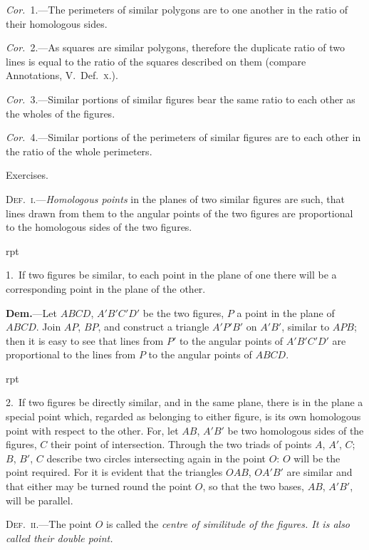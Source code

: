 \documentclass[oneside]{book}
\newcommand\exhead[1]{
\Needspace*{5\baselineskip}\begin{center}
\textsf{#1}
\end{center}
}
\newcommand\imgflow[3]{
\setcounter{wrapwidth}{#1}
\begin{wrapfigure}[#2]{r}{\value{wrapwidth}pt}
\begin{center}
\vspace{-0.3in}
\end{center}
\end{wrapfigure}
}
\begin{document}
\emph{Cor.}~1.---The perimeters of similar polygons are to
one another in the ratio of their homologous sides.

\emph{Cor.}~2.---As squares are similar polygons, therefore
the duplicate ratio of two lines is equal to the ratio of
the squares described on them (compare Annotations,
V.~Def.~\textsc{x.}).

\emph{Cor.}~3.---Similar portions of similar figures bear the
same ratio to each other as the wholes of the figures.

\emph{Cor.}~4.---Similar portions of the perimeters of similar
figures are to each other in the ratio of the whole perimeters.


\exhead{Exercises.}

\textsc{Def.~i.}---\emph{Homologous points} in the planes of two
similar figures are such, that lines drawn from them
to the angular points of the two figures are proportional
to the homologous sides of the two figures.

\smallskip
\imgflow{190}{11}{f199}

\begin{footnotesize}
1.~If two figures be similar, to each point in the plane of one
there will be a corresponding
point in the
plane of the other.

\textbf{Dem.}---Let $ABCD$,
$A'B'C'D'$ be the two
figures, $P$ a point in
the plane of $ABCD$.
Join $AP$, $BP$, and construct
a triangle $A'P'B'$
on $A'B'$, similar to
$APB$; then it is easy to see that lines from $P'$ to the angular
points of $A'B'C'D'$ are proportional to the lines from $P$ to the
angular points of $ABCD$.

\imgflow{170}{12}{f200}

2.~If two figures be directly similar, and in the same plane,
there is in the plane a special point which, regarded as belonging
to either figure, is its own
homologous point with respect
to the other. For,
let $AB$, $A'B'$ be two homologous
sides of the figures,
$C$ their point of intersection.
Through the two triads of
points $A$, $A'$, $C$; $B$, $B'$, $C$
describe two circles intersecting
again in the point
$O$: $O$ will be the point required.
For it is evident
that the triangles $OAB$, $OA'B'$ are similar and that either may
be turned round the point $O$, so that the two bases, $AB$, $A'B'$,
will be parallel.
\par\end{footnotesize}

\textsc{Def.~ii.}---The point $O$ is called the \emph{centre of similitude
of the figures. It is also called their double point.}
\end{document}

